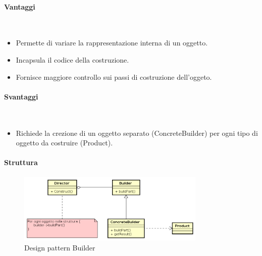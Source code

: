 \paragraph{Vantaggi} \mbox{} \\
\begin{itemize}
\item Permette di variare la rappresentazione interna di un oggetto.
\item Incapsula il codice della costruzione.
\item Fornisce maggiore controllo sui passi di costruzione dell'oggeto.
\end{itemize}
\paragraph{Svantaggi} \mbox{} \\
\begin{itemize}
\item Richiede la crezione di un oggetto separato (ConcreteBuilder) per ogni tipo di oggetto da costruire (Product).
\end{itemize}
\paragraph{Struttura}
\begin{figure}[H]
\centering
\includegraphics[width=0.8\textwidth]{res/sections/backend/builder.png}
\caption{Design pattern Builder}
\end{figure}
